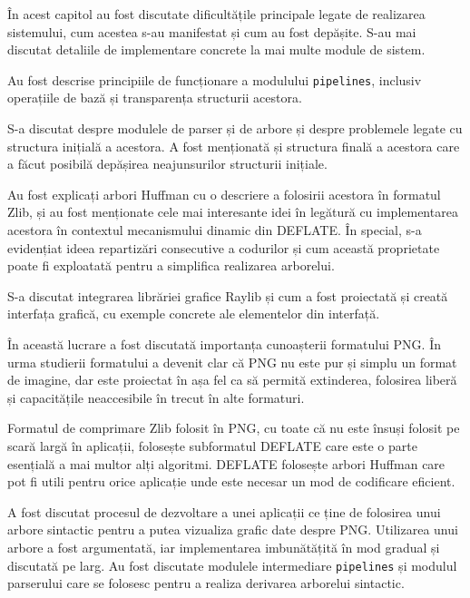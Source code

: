 \documentclass[a4paper,12pt]{report}
\begin{document}

În acest capitol au fost discutate dificultățile principale legate de realizarea sistemului,
cum acestea s-au manifestat și cum au fost depășite.
S-au mai discutat detaliile de implementare concrete la mai multe module de sistem.

Au fost descrise principiile de funcționare a modulului \texttt{pipelines},
inclusiv operațiile de bază și transparența structurii acestora.

S-a discutat despre modulele de parser și de arbore
și despre problemele legate cu structura inițială a acestora.
A fost menționată și structura finală a acestora care
a făcut posibilă depășirea neajunsurilor structurii inițiale.

Au fost explicați arbori Huffman cu o descriere a folosirii acestora în formatul Zlib,
și au fost menționate cele mai interesante idei în legătură cu implementarea acestora
în contextul mecanismului dinamic din DEFLATE.
În special, s-a evidențiat ideea repartizări consecutive a codurilor și cum această proprietate poate fi
exploatată pentru a simplifica realizarea arborelui.

S-a discutat integrarea librăriei grafice Raylib și cum a fost proiectată și creată interfața grafică,
cu exemple concrete ale elementelor din interfață.



În această lucrare a fost discutată importanța cunoașterii formatului \ac{PNG}.
În urma studierii formatului a devenit clar că \ac{PNG} nu este pur și simplu un format de imagine,
dar este proiectat în așa fel ca să permită extinderea, folosirea liberă și
capacitățile neaccesibile în trecut în alte formaturi.

Formatul de comprimare Zlib folosit în \ac{PNG},
cu toate că nu este însuși folosit pe scară largă în aplicații,
folosește subformatul DEFLATE care este o parte esențială a mai multor alți algoritmi.
DEFLATE folosește arbori Huffman care pot fi utili pentru orice aplicație
unde este necesar un mod de codificare eficient.

A fost discutat procesul de dezvoltare a unei aplicații ce ține de folosirea unui arbore sintactic
pentru a putea vizualiza grafic date despre \ac{PNG}.
Utilizarea unui arbore a fost argumentată, iar implementarea imbunătățită în mod gradual și discutată pe larg.
Au fost discutate modulele intermediare \texttt{pipelines} și modulul parserului care
se folosesc pentru a realiza derivarea arborelui sintactic.
\end{document}

